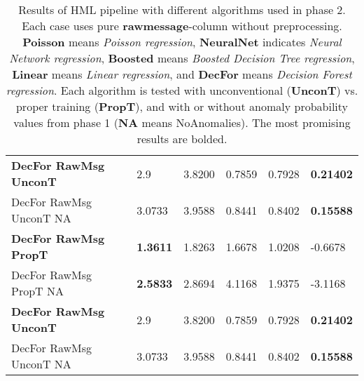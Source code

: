 \begin{table}[htb]
\begin{tabularx}{\textwidth}{|Y|L{0.10\textwidth}|L{0.10\textwidth}|L{0.08\textwidth}|L{0.08\textwidth}|L{0.12\textwidth}|}
        \hline
        \textbf{DecFor RawMsg UnconT }      & 2.9   			& 3.8200		& 0.7859	    & 0.7928	& \textbf{0.21402}		\\
        DecFor RawMsg UnconT NA             & 3.0733			& 3.9588		& 0.8441		& 0.8402	& \textbf{0.15588}		\\
        \hline
        \textbf{DecFor RawMsg PropT}       	& \textbf{1.3611}	& 1.8263		& 1.6678		& 1.0208	& -0.6678		\\
        DecFor RawMsg PropT NA           	& \textbf{2.5833}	& 2.8694		& 4.1168		& 1.9375	& -3.1168		\\
        \hline
        \textbf{DecFor RawMsg UnconT }      & 2.9   			& 3.8200		& 0.7859		& 0.7928	& \textbf{0.21402}		\\
        DecFor RawMsg UnconT NA             & 3.0733			& 3.9588		& 0.8441		& 0.8402	& \textbf{0.15588}		\\
        \hline

    \end{tabularx}
    \caption{Results of HML pipeline with different algorithms used in phase 2.
    Each case uses pure \textbf{rawmessage}-column without preprocessing.
    \textbf{Poisson} means \textit{Poisson regression},
        \textbf{NeuralNet} indicates \textit{Neural Network regression},
        \textbf{Boosted} means \textit{Boosted Decision Tree regression},
        \textbf{Linear} means \textit{Linear regression}, and
        \textbf{DecFor} means \textit{Decision Forest regression}.
        Each algorithm is tested with unconventional (\textbf{UnconT}) vs. proper training (\textbf{PropT}),
        and with or without anomaly probability values from phase 1 (\textbf{NA} means NoAnomalies).
        The most promising results are bolded.
    }
    \label{tab:results-rawmsg-fhash-algorithm-comparison}
\end{table}



















